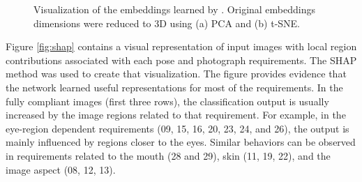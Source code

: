 \begin{figure}[ht]
\centering
{}
\caption{Visualization of the embeddings learned by \methodname. Original embeddings dimensions were reduced to 3D using (a) PCA and (b) t-SNE.}
\label{fig:embviz}
\end{figure}

Figure \ref{fig:shap} contains a visual representation of input images with local region contributions associated with each pose and photograph requirements. The SHAP \citep{shap2018} method was used to create that visualization. The figure provides evidence that the network learned useful representations for most of the requirements. In the fully compliant images (first three rows), the classification output is usually increased by the image regions related to that requirement. For example, in the eye-region dependent requirements (09, 15, 16, 20, 23, 24, and 26), the output is mainly influenced by regions closer to the eyes. Similar behaviors can be observed in requirements related to the mouth (28 and 29), skin (11, 19, 22), and the image aspect (08, 12, 13). 

